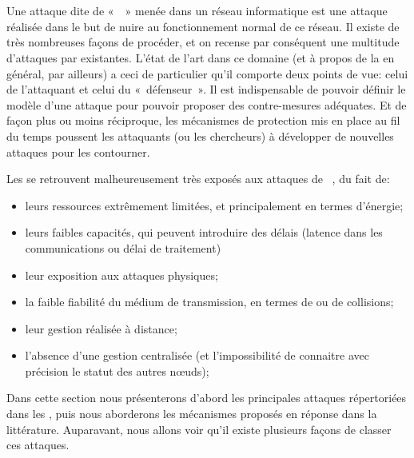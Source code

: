 \section{\Dds}\label{ea:sec:dos}

Une attaque dite de « \dds » menée dans un réseau informatique est une attaque réalisée dans le but de nuire au fonctionnement normal de ce réseau.
Il existe de très nombreuses façons de procéder, et on recense par conséquent une multitude d'attaques par \dds existantes.
L'état de l'art dans ce domaine (et à propos de la \secu en général, par ailleurs) a ceci de particulier qu'il comporte deux points de vue: celui de l'attaquant et celui du « défenseur ».
Il est indispensable de pouvoir définir le modèle d'une attaque pour pouvoir proposer des contre-mesures adéquates.
Et de façon plus ou moins réciproque, les mécanismes de protection mis en place au fil du temps poussent les attaquants (ou les chercheurs) à développer de nouvelles attaques pour les contourner.

Les \rcs se retrouvent malheureusement très exposés aux attaques de \dds~\cite{RM11}, du fait de:
\begin{itemize}
    \item leurs ressources extrêmement limitées, et principalement en termes d'énergie;
    \item leurs faibles capacités, qui peuvent introduire des délais (latence dans les communications ou délai de traitement)
    \item leur exposition aux attaques physiques;
    \item la faible fiabilité du médium de transmission, en termes de  ou de collisions;
    \item leur gestion réalisée à distance;
    \item l'absence d'une gestion centralisée (et l'impossibilité de connaitre avec précision le statut des autres nœuds);
\end{itemize}

Dans cette section nous présenterons d'abord les principales attaques répertoriées dans les \rcs, puis nous aborderons les mécanismes proposés en réponse dans la littérature.
Auparavant, nous allons voir qu'il existe plusieurs façons de classer ces attaques.










